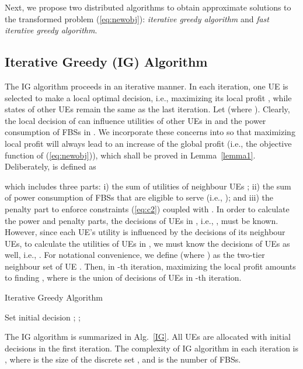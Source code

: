 \documentclass[conference]{IEEEtran}
\begin{document}
Next, we propose two distributed algorithms to obtain approximate solutions to the transformed problem (\ref{eq:newobj}): \textit{iterative greedy algorithm} and \textit{fast iterative greedy algorithm}.

\subsection{Iterative Greedy (IG) Algorithm}




The IG algorithm proceeds in an iterative manner. In each iteration, one UE is selected to make a local optimal decision, i.e., maximizing its local profit , while states of other UEs remain the same as the last iteration. Let  (where ). Clearly, the local decision of  can influence utilities of other UEs in  and the power consumption of FBSs in . We incorporate these concerns into  so that maximizing local profit  will always lead to an increase of the global profit (i.e., the objective function of (\ref{eq:newobj})), which shall be proved in Lemma~\ref{lemma1}. Deliberately,  is defined as 

which includes three parts: i) the sum of utilities of neighbour UEs ; ii) the sum of power consumption of FBSs that are eligible to serve  (i.e., ); and iii) the penalty part to enforce constraints (\ref{eq:c2}) coupled with . In order to calculate the power and penalty parts, the decisions of UEs in , i.e., , must be known. However, since each UE's utility is influenced by the decisions of its neighbour UEs, to calculate the utilities of UEs in , we must know the decisions of UEs  as well, i.e., . For notational convenience, we define  (where ) as the two-tier neighbour set of UE . Then, in -th iteration, maximizing the local profit  amounts to finding , where  is the union of decisions of UEs  in -th iteration.

\begin{algorithm}[h]
\caption{Iterative Greedy Algorithm}
\label{IG}
Set initial decision ; ;\\
\end{algorithm}

The IG algorithm is summarized in Alg.~\ref{IG}. All UEs are allocated with initial decisions in the first iteration. The complexity of IG algorithm in each iteration is , where  is the size of the discrete set , and  is the number of FBSs.
\end{document}
